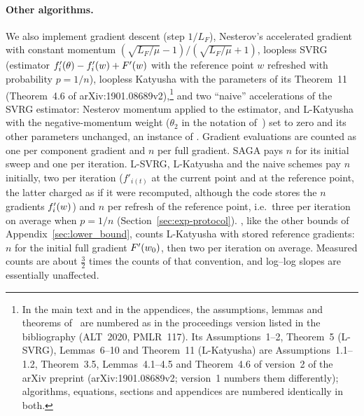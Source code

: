 \paragraph{Other algorithms.}
We also implement gradient descent (step $1/L_F$), Nesterov's accelerated gradient with constant momentum
$(\sqrt{L_F/\mu}-1)/(\sqrt{L_F/\mu}+1)$, loopless SVRG \cite{hofmann2015variance,kovalev2020dont} (estimator
$f'_i(\theta) - f'_i(w) + F'(w)$ with the reference point $w$ refreshed with probability $p = 1/n$), loopless
Katyusha \cite{kovalev2020dont} with the parameters of its Theorem~11 (Theorem~4.6 of
arXiv:1901.08689v2),\footnote{In the main text and in the appendices, the assumptions, lemmas and theorems
of~\cite{kovalev2020dont} are numbered as in the proceedings version listed in the bibliography (ALT~2020, PMLR~117).
Its Assumptions~1--2, Theorem~5 (L-SVRG), Lemmas~6--10 and Theorem~11 (L-Katyusha) are Assumptions~1.1--1.2,
Theorem~3.5, Lemmas~4.1--4.5 and Theorem~4.6 of version~2 of the arXiv preprint (arXiv:1901.08689v2; version~1
numbers them differently); algorithms, equations, sections and appendices are numbered identically in both.} and two
``naive'' accelerations of the SVRG estimator: Nesterov momentum applied to the estimator, and L-Katyusha with the
negative-momentum weight ($\theta_2$ in the notation of~\cite{kovalev2020dont}) set to zero and its other parameters
unchanged, an instance of . Gradient evaluations are counted as one per component gradient and $n$
per full gradient. SAGA pays $n$ for its initial sweep and one per iteration. L-SVRG, L-Katyusha and the naive schemes
pay $n$ initially, two per iteration ($f'_{i(t)}$ at the current point and at the reference point, the latter charged
as if it were recomputed, although the code stores the $n$ gradients $f'_i(w)$) and $n$ per refresh of the reference
point, i.e.\ three per iteration on average when $p=1/n$ (Section~\ref{sec:exp-protocol}). , like the
other bounds of Appendix~\ref{sec:lower_bound}, counts L-Katyusha with stored reference gradients: $n$ for the initial
full gradient $F'(w_0)$, then two per iteration on average. Measured counts are about $\frac32$ times the counts of
that convention, and log--log slopes are essentially unaffected.

